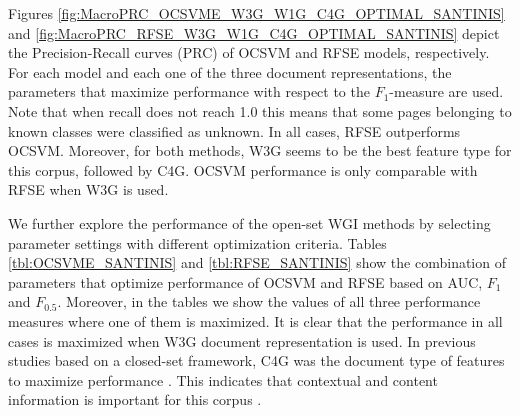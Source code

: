 \documentclass[runningheads]{llncs}
\begin{document}
Figures \ref{fig:MacroPRC_OCSVME_W3G_W1G_C4G_OPTIMAL_SANTINIS} and \ref{fig:MacroPRC_RFSE_W3G_W1G_C4G_OPTIMAL_SANTINIS} depict the Precision-Recall curves (PRC) of OCSVM and RFSE models, respectively. For each model and each one of the three document representations, the parameters that maximize performance with respect to the $F_{1}$-measure are used. Note that when recall does not reach 1.0 this means that some pages belonging to known classes were classified as unknown. In all cases, RFSE outperforms OCSVM. Moreover, for both methods, W3G seems to be the best feature type for this corpus, followed by C4G. OCSVM performance is only comparable with RFSE when W3G is used.

\hfill \break


%

We further explore the performance of the open-set WGI methods by selecting parameter settings with different optimization criteria. Tables \ref{tbl:OCSVME_SANTINIS} and \ref{tbl:RFSE_SANTINIS} show the combination of parameters that optimize performance of OCSVM and RFSE based on AUC, $F_{1}$ and $F_{0.5}$. Moreover, in the tables we show the values of all three performance measures where one of them is maximized. It is clear that the performance in all cases is maximized when W3G document representation is used. In previous studies based on a closed-set framework, C4G was the document type of features to maximize performance \citep{Sharroff2010}. This indicates that contextual and content information is important for this corpus \citep{Asheghi2015}.
\end{document}
